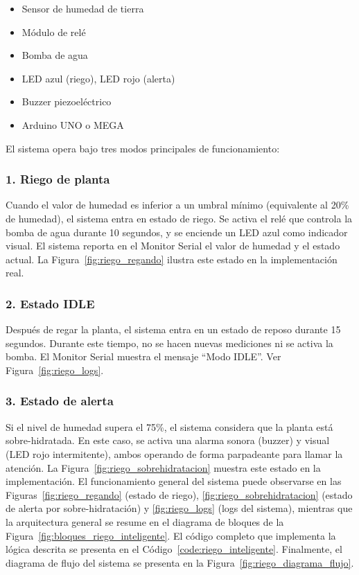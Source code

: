 \begin{itemize}
    \item Sensor de humedad de tierra
    \item Módulo de relé
    \item Bomba de agua
    \item LED azul (riego), LED rojo (alerta)
    \item Buzzer piezoeléctrico
    \item Arduino UNO o MEGA
\end{itemize}

El sistema opera bajo tres modos principales de funcionamiento:

\subsubsection*{1. Riego de planta}
Cuando el valor de humedad es inferior a un umbral mínimo (equivalente al 20\% de humedad), el sistema entra en estado de riego. Se activa el relé que controla la bomba de agua durante 10 segundos, y se enciende un LED azul como indicador visual. El sistema reporta en el Monitor Serial el valor de humedad y el estado actual. La Figura~\ref{fig:riego_regando} ilustra este estado en la implementación real.

\subsubsection*{2. Estado IDLE}
Después de regar la planta, el sistema entra en un estado de reposo durante 15 segundos. Durante este tiempo, no se hacen nuevas mediciones ni se activa la bomba. El Monitor Serial muestra el mensaje “Modo IDLE”. Ver Figura~\ref{fig:riego_logs}.

\subsubsection*{3. Estado de alerta}
Si el nivel de humedad supera el 75\%, el sistema considera que la planta está sobre-hidratada. En este caso, se activa una alarma sonora (buzzer) y visual (LED rojo intermitente), ambos operando de forma parpadeante para llamar la atención. La Figura~\ref{fig:riego_sobrehidratacion} muestra este estado en la implementación. El funcionamiento general del sistema puede observarse en las Figuras~\ref{fig:riego_regando} (estado de riego), \ref{fig:riego_sobrehidratacion} (estado de alerta por sobre-hidratación) y \ref{fig:riego_logs} (logs del sistema), mientras que la arquitectura general se resume en el diagrama de bloques de la Figura~\ref{fig:bloques_riego_inteligente}. El código completo que implementa la lógica descrita se presenta en el Código~\ref{code:riego_inteligente}. Finalmente, el diagrama de flujo del sistema se presenta en la Figura~\ref{fig:riego_diagrama_flujo}.


